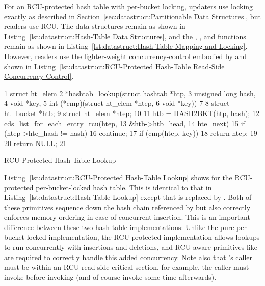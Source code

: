 For an RCU-protected hash table with per-bucket locking,
updaters use locking exactly as described in
Section~\ref{sec:datastruct:Partitionable Data Structures},
but readers use RCU.
The data structures remain as shown in
Listing~\ref{lst:datastruct:Hash-Table Data Structures},
and the , , and 
functions remain as shown in
Listing~\ref{lst:datastruct:Hash-Table Mapping and Locking}.
However, readers use the lighter-weight concurrency-control embodied
by  and 
shown in
Listing~\ref{lst:datastruct:RCU-Protected Hash-Table Read-Side Concurrency Control}.

\begin{listing}[tb]
{ \scriptsize
\begin{verbbox}
 1 struct ht_elem
 2 *hashtab_lookup(struct hashtab *htp,
 3                 unsigned long hash,
 4                 void *key,
 5                 int (*cmp)(struct ht_elem *htep,
 6                            void *key))
 7 {
 8   struct ht_bucket *htb;
 9   struct ht_elem *htep;
10 
11   htb = HASH2BKT(htp, hash);
12   cds_list_for_each_entry_rcu(htep,
13                               &htb->htb_head,
14                               hte_next) {
15     if (htep->hte_hash != hash)
16       continue;
17     if (cmp(htep, key))
18       return htep;
19   }
20   return NULL;
21 }
\end{verbbox}
}
\centering
\theverbbox
\caption{RCU-Protected Hash-Table Lookup}
\label{lst:datastruct:RCU-Protected Hash-Table Lookup}
\end{listing}

Listing~\ref{lst:datastruct:RCU-Protected Hash-Table Lookup}
shows  for the RCU-protected per-bucket-locked
hash table.
This is identical to that in
Listing~\ref{lst:datastruct:Hash-Table Lookup}
except that  is replaced
by .
Both of these primitives sequence down the hash chain referenced
by  but  also
correctly enforces memory ordering in case of concurrent insertion.
This is an important difference between these two hash-table implementations:
Unlike the pure per-bucket-locked implementation, the RCU protected
implementation allows lookups to run concurrently with insertions
and deletions, and RCU-aware primitives like
 are required to correctly handle
this added concurrency.
Note also that 's caller must be within an
RCU read-side critical section, for example, the caller must invoke
 before invoking 
(and of course invoke  some time afterwards).

